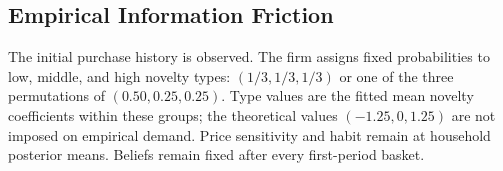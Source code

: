 \documentclass[12pt]{article}
\theoremstyle{definition}
\theoremstyle{remark}
\begin{document}

\FloatBarrier



\subsection{Empirical Information Friction}
\label{subsec:empirical-information}
The initial purchase history is observed. The firm assigns fixed probabilities
to low, middle, and high novelty types: $(1/3,1/3,1/3)$ or one of the three
permutations of $(0.50,0.25,0.25)$. Type values are the fitted mean novelty
coefficients within these groups; the theoretical values $(-1.25,0,1.25)$ are
not imposed on empirical demand. Price sensitivity and habit remain at household
posterior means. Beliefs remain fixed after every first-period basket.
\end{document}
